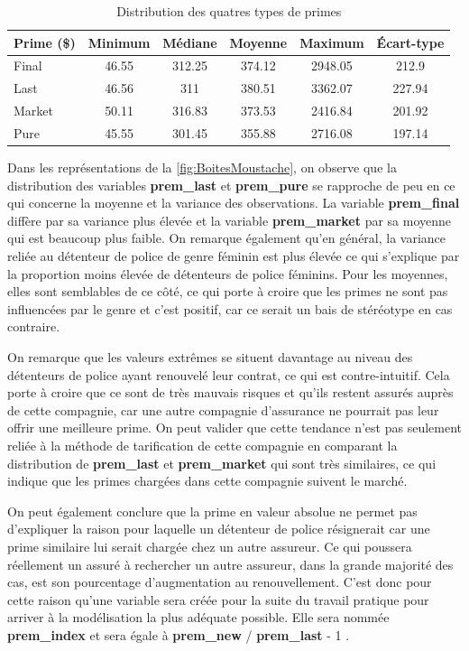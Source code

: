 \documentclass[
]{article}
\begin{document}
\begin{table}[ht]
\centering
\caption{Distribution des quatres types de primes} 
\label{}
\begin{tabular}{lccccc}
  \hline
Prime (\$) & Minimum & Médiane & Moyenne & Maximum & Écart-type \\ 
  \hline
Final & 46.55 & 312.25 & 374.12 & 2948.05 & 212.9 \\ 
  Last & 46.56 & 311 & 380.51 & 3362.07 & 227.94 \\ 
  Market & 50.11 & 316.83 & 373.53 & 2416.84 & 201.92 \\ 
  Pure & 45.55 & 301.45 & 355.88 & 2716.08 & 197.14 \\ 
   \hline
\end{tabular}
\end{table}

Dans les représentations de la \autoref{fig:BoitesMoustache}, on observe
que la distribution des variables \textbf{prem\_last} et
\textbf{prem\_pure} se rapproche de peu en ce qui concerne la moyenne et
la variance des observations. La variable \textbf{prem\_final} diffère
par sa variance plus élevée et la variable \textbf{prem\_market} par sa
moyenne qui est beaucoup plus faible. On remarque également qu'en
général, la variance reliée au détenteur de police de genre féminin est
plus élevée ce qui s'explique par la proportion moins élevée de
détenteurs de police féminins. Pour les moyennes, elles sont semblables
de ce côté, ce qui porte à croire que les primes ne sont pas influencées
par le genre et c'est positif, car ce serait un bais de stéréotype en
cas contraire.

On remarque que les valeurs extrêmes se situent davantage au niveau des
détenteurs de police ayant renouvelé leur contrat, ce qui est
contre-intuitif. Cela porte à croire que ce sont de très mauvais risques
et qu'ils restent assurés auprès de cette compagnie, car une autre
compagnie d'assurance ne pourrait pas leur offrir une meilleure prime.
On peut valider que cette tendance n'est pas seulement reliée à la
méthode de tarification de cette compagnie en comparant la distribution
de \textbf{prem\_last} et \textbf{prem\_market} qui sont très
similaires, ce qui indique que les primes chargées dans cette compagnie
suivent le marché.

On peut également conclure que la prime en valeur absolue ne permet pas
d'expliquer la raison pour laquelle un détenteur de police résignerait
car une prime similaire lui serait chargée chez un autre assureur. Ce
qui poussera réellement un assuré à rechercher un autre assureur, dans
la grande majorité des cas, est son pourcentage d'augmentation au
renouvellement. C'est donc pour cette raison qu'une variable sera créée
pour la suite du travail pratique pour arriver à la modélisation la plus
adéquate possible. Elle sera nommée \textbf{prem\_index} et sera égale à
\textbf{prem\_new} / \textbf{prem\_last} - 1 .
\end{document}
